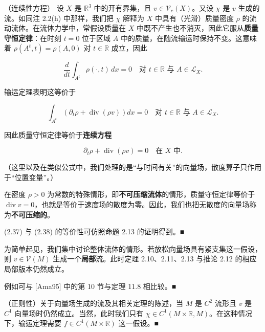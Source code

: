 \begin{example}

（连续性方程） 设 $ X $ 是 $ \mathbb{R}^3 $ 中的开有界集，且 $ v \in \mathcal{V}_c(X) $。又设 $ \chi $ 是 $ v $ 生成的流。如同注 2.2(h) 中那样，我们把 $ \chi $ 解释为 $ X $ 中具有（光滑）质量密度 $ \rho $ 的流动流体。在流体力学中，常假设质量在 $ X $ 中既不产生也不消灭，因此它服从\textbf{质量守恒定律}：在时刻 $ t = 0 $ 位于区域 $ A $ 中的质量，在随流输运时保持不变。这意味着 $ \rho(A^t,t) = \rho(A,0) $ 对 $ t \in \mathbb{R} $ 成立，因此

\[
\frac{d}{dt}\int_{A^t} \rho(\cdot,t)\,dx = 0 \quad \text{对 } t \in \mathbb{R} \text{ 与 } A \in \mathcal{L}_X .
\]

输运定理表明这等价于

\begin{equation}
\int_{A^t}\left(\partial_t\rho + \operatorname{div}(\rho v)\right) dx = 0 \quad \text{对 } t \in \mathbb{R} \text{ 与 } A \in \mathcal{L}_X .\tag{2.37}
\end{equation}

因此质量守恒定律等价于\textbf{连续方程}

\begin{equation}
\partial_t\rho + \operatorname{div}(\rho v) = 0 \quad \text{在 } X \text{ 中} .\tag{2.38}
\end{equation}

（这里以及在类似公式中，我们处理的是“与时间有关”的向量场，散度算子只作用于“位置变量”。）

在密度 $ \rho > 0 $ 为常数的特殊情形，即\textbf{不可压缩流体}的情形，质量守恒定律等价于 $ \operatorname{div} v = 0 $，也就是等价于速度场的散度为零。因此，我们也把无散度的向量场称为\textbf{不可压缩的}。

\proofhead
(2.37) 与 (2.38) 的等价性可仿照命题 2.13 的证明得到。\nobreak\hspace{0.35em}■
\end{example}

\begin{remark}

\begin{items}
\item

为简单起见，我们集中讨论整体流体的情形。若放松向量场具有紧支集这一假设，则 $ v \in \mathcal{V}(M) $ 生成一个\textbf{局部}流。此时定理 2.10、2.11、2.13 与推论 2.12 的相应局部版本仍然成立。

\proofhead
例如可与 [Ama95] 中的第 10 节与定理 11.8 相比较。\nobreak\hspace{0.35em}■
\item

（正则性）关于向量场生成的流及其相关定理的陈述，当 $ M $ 是 $ C^2 $ 流形且 $ v $ 是 $ C^1 $ 向量场时仍然成立。当然，此时我们只有 $ \chi \in C^1(M \times \mathbb{R}, M) $。在这种情况下，输运定理需要 $ f \in C^1(M \times \mathbb{R}) $ 这一假设。\nobreak\hspace{0.35em}■

\end{items}

\end{remark}

